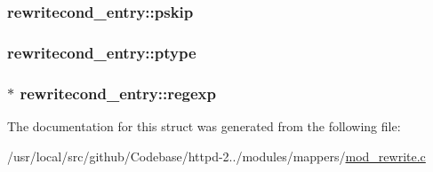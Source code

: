 \subsubsection[{\texorpdfstring{pskip}{pskip}}]{ rewritecond\+\_\+entry\+::pskip}\hypertarget{structrewritecond__entry_ab6fb2d4ae37a04bac28caea94403794c}{}\label{structrewritecond__entry_ab6fb2d4ae37a04bac28caea94403794c}
\subsubsection[{\texorpdfstring{ptype}{ptype}}]{ rewritecond\+\_\+entry\+::ptype}\hypertarget{structrewritecond__entry_a6e089866fe73c830b77be8f00969c5cd}{}\label{structrewritecond__entry_a6e089866fe73c830b77be8f00969c5cd}
\subsubsection[{\texorpdfstring{regexp}{regexp}}]{$\ast$ rewritecond\+\_\+entry\+::regexp}\hypertarget{structrewritecond__entry_acfb985a24078d1c9d29fbbab5ca46182}{}\label{structrewritecond__entry_acfb985a24078d1c9d29fbbab5ca46182}


The documentation for this struct was generated from the following file\+:\begin{DoxyCompactItemize}
\item 
/usr/local/src/github/\+Codebase/httpd-\/2../modules/mappers/\hyperlink{mod__rewrite_8c}{mod\+\_\+rewrite.\+c}\end{DoxyCompactItemize}
